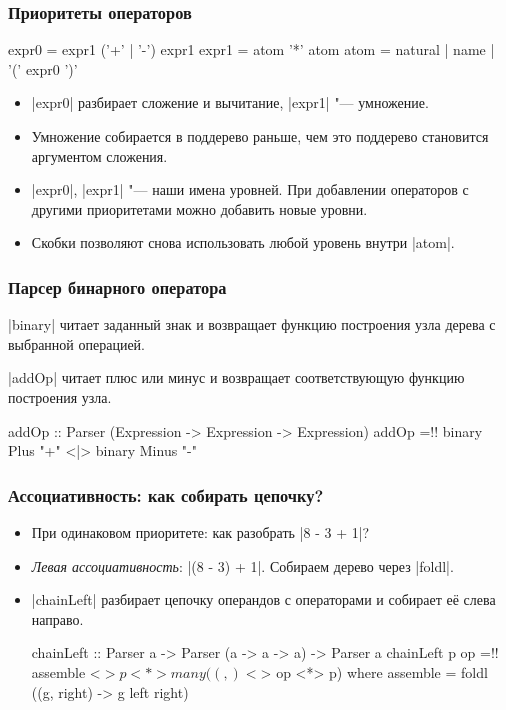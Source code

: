 \documentclass[11pt]{beamer}
\begin{document}
\begin{frame}[fragile]
  \frametitle{Приоритеты операторов}
  \begin{haskell}
    expr0 = expr1 { ('+' | '-') expr1 }
    expr1 = atom  { '*' atom }
    atom  = natural | name | '(' expr0 ')'
  \end{haskell}
  \begin{itemize}
    \item \haskinline|expr0| разбирает сложение и вычитание, \haskinline|expr1| "--- умножение.
    \item Умножение собирается в поддерево раньше, чем это поддерево становится аргументом сложения.
      \pause
    \item \haskinline|expr0|, \haskinline|expr1| "--- наши имена уровней. При добавлении операторов с другими приоритетами можно добавить новые уровни.
    \item Скобки позволяют снова использовать любой уровень внутри \haskinline|atom|.
  \end{itemize}
\end{frame}

\begin{frame}[fragile]
  \frametitle{Парсер бинарного оператора}
  \haskinline|binary| читает заданный знак и возвращает функцию построения узла дерева с выбранной операцией.
  \pause
  \pause
  \haskinline|addOp| читает плюс или минус и возвращает соответствующую функцию построения узла.
  \pause
  \begin{haskellsmall}
    addOp :: Parser (Expression -> Expression -> Expression)
    addOp =!\pause! binary Plus "+" <|> binary Minus "-"
  \end{haskellsmall}
\end{frame}

\begin{frame}[fragile]
  \frametitle{Ассоциативность: как собирать цепочку?}
  \begin{itemize}
    \item При одинаковом приоритете: как разобрать \haskinline|8 - 3 + 1|?
      \pause
    \item \emph{Левая ассоциативность}: \haskinline|(8 - 3) + 1|. Собираем дерево через \haskinline|foldl|.
    \item \haskinline|chainLeft| разбирает цепочку операндов с операторами и собирает её слева направо.
      \pause
      \begin{haskellsmall}
        chainLeft :: Parser a ->
                     Parser (a -> a -> a) -> Parser a
        chainLeft p op =!\pause! assemble <$> p
                                 <*> many ((,) <$> op <*> p)
          where
            assemble = foldl (\left (g, right) ->
                               g left right)
      \end{haskellsmall}
  \end{itemize}
\end{frame}
\end{document}

